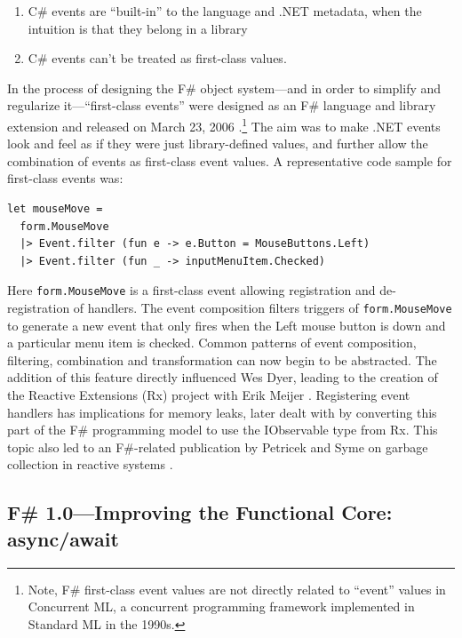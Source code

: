 \documentclass[acmsmall,screen]{acmart}
\begin{document}
\begin{enumerate}
\item C\# events are “built-in” to the language and .NET metadata, when the intuition is that they belong in a library
\item C\# events can’t be treated as first-class values.  
\end{enumerate}

In the process of designing the F\# object system---and in order to simplify and regularize it---“first-class events” were designed as an F\# language and library
extension and released on March 23, 2006 \citep{RefFirstClassEventsBlog}.\footnote{Note, F\# first-class event values are not directly related to ``event'' values in
Concurrent ML, a concurrent programming framework implemented in Standard ML in the 1990s.}
The aim was to make .NET events look and feel as if they were just library-defined values, and further allow the combination of
events as first-class event values. A representative code sample for first-class events was:

\begin{verbatim}
let mouseMove = 
  form.MouseMove 
  |> Event.filter (fun e -> e.Button = MouseButtons.Left)
  |> Event.filter (fun _ -> inputMenuItem.Checked)
\end{verbatim}

Here \texttt{form.MouseMove} is a first-class event allowing registration and de-registration of handlers.  The event composition filters triggers of \texttt{form.MouseMove} to generate a new event that only fires when the Left mouse button is down and a particular menu item is checked.  Common patterns of event composition, filtering, combination and transformation can now begin to be abstracted.  The addition of this feature directly influenced Wes Dyer, leading to the creation of the Reactive Extensions (Rx) project with
Erik Meijer \citep{RefRx}. Registering event handlers has implications for memory leaks, later dealt with by converting this part of the F\# programming model to use the IObservable type from Rx.  This topic also led to an F\#-related publication by Petricek and Syme on garbage collection in reactive systems \citep{Petricek2010}.



\subsection*{F\# 1.0---Improving the Functional Core: async/await}
\end{document}
